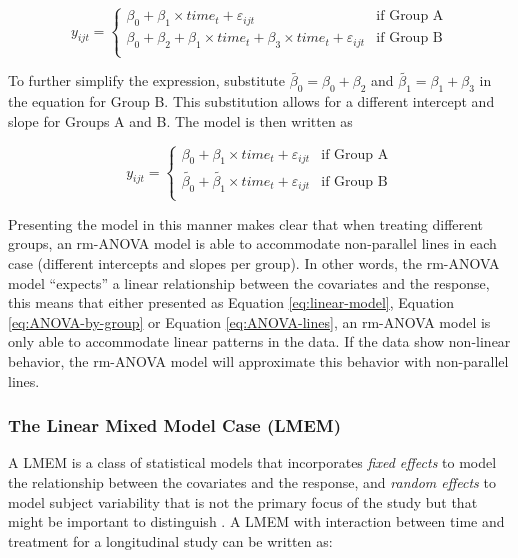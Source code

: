 \documentclass[Royal,times,doublespace,sagev]{sagej}
\begin{document}
\begin{equation}
y_{ijt} = \begin{cases}
\beta_0 + \beta_1\times time_{t}+\varepsilon_{ijt}   & \mbox{if Group A}\\
\beta_0 + \beta_2+\beta_1 \times time_{t} +\beta_3 \times time_{t}+\varepsilon_{ijt}  & \mbox{if Group B}\\
\end{cases}
\label{eq:ANOVA-by-group}
\end{equation}

To further simplify the expression, substitute \(\widetilde{\beta_{0}}=\beta_0+\beta_{2}\) and \(\widetilde{\beta_{1}}=\beta_{1}+\beta_{3}\) in the equation for Group B. This substitution allows for a different intercept and slope for Groups A and B. The model is then written as

\begin{equation}
y_{ijt} = \begin{cases}
\beta_0 + \beta_1\times time_{t}+\varepsilon_{ijt}   & \mbox{if Group A}\\
\widetilde{\beta_{0}} + \widetilde{\beta_1} \times time_{t}+\varepsilon_{ijt}  & \mbox{if Group B}\\
\end{cases}
\label{eq:ANOVA-lines}
\end{equation}

Presenting the model in this manner makes clear that when treating different groups, an rm-ANOVA model is able to accommodate non-parallel lines in each case (different intercepts and slopes per group). In other words, the rm-ANOVA model ``expects'' a linear relationship between the covariates and the response, this means that either presented as Equation \eqref{eq:linear-model}, Equation \eqref{eq:ANOVA-by-group} or Equation \eqref{eq:ANOVA-lines}, an rm-ANOVA model is only able to accommodate linear patterns in the data. If the data show non-linear behavior, the rm-ANOVA model will approximate this behavior with non-parallel lines.

\hypertarget{the-linear-mixed-model-case-lmem}{%
\subsubsection{The Linear Mixed Model Case (LMEM)}\label{the-linear-mixed-model-case-lmem}}

A LMEM is a class of statistical models that incorporates \emph{fixed effects} to model the relationship between the covariates and the response, and \emph{random effects} to model subject variability that is not the primary focus of the study but that might be important to distinguish \cite{pinheiro2006, west2014}. A LMEM with interaction between time and treatment for a longitudinal study can be written as:
\end{document}
